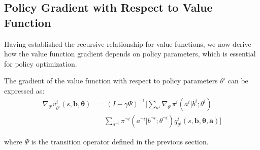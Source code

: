 \subsection{Policy Gradient with Respect to Value Function}
Having established the recursive relationship for value functions, we now derive
how the value function gradient depends on policy parameters, which is essential
for policy optimization.
\begin{lemma}
    The gradient of the value function with respect to policy parameters $\theta^{i}$
    can be expressed as:
    \begin{align}
        \nabla_{\theta^i}v^{i}_{\theta^i}(s, \boldsymbol{b}, \boldsymbol{\theta}) & = (I - \gamma \Psi)^{-1}\Bigg[\sum_{a^i}\nabla_{\theta^i}\pi^{i}(a^{i}|b^{i}; \theta^{i}) \nonumber                                                        \\
                                                                                  & \quad \sum_{a^{\neg i}}\pi^{\neg i}(a^{\neg i}|b^{\neg i}; \theta^{\neg i}) q^{i}_{\theta^i}(s, \boldsymbol{b}, \boldsymbol{\theta}, \boldsymbol{a})\Bigg]
    \end{align}

    where $\Psi$ is the transition operator defined in the previous section.
\end{lemma}
